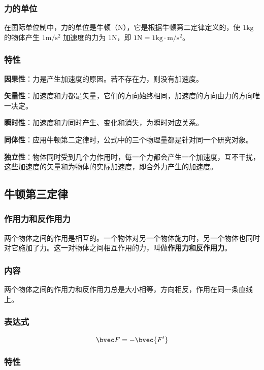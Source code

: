 \subsubsection{力的单位}
在国际单位制中，力的单位是牛顿（$\mathrm N$），它是根据牛顿第二定律定义的，使 $1\mathrm{kg}$ 的物体产生 $1\mathrm{m/s^2}$ 加速度的力为 $1\mathrm N$，即 $1\mathrm N=1\mathrm{kg \cdot m/s^2}$。

\subsubsection{特性}
\textbf{因果性}：力是产生加速度的原因。若不存在力，则没有加速度。

\textbf{矢量性}：加速度和力都是矢量，它们的方向始终相同，加速度的方向由力的方向唯一决定。

\textbf{瞬时性}：加速度和力同时产生、变化和消失，为瞬时对应关系。

\textbf{同体性}：应用牛顿第二定律时，公式中的三个物理量都是针对同一个研究对象。

\textbf{独立性}：物体同时受到几个力作用时，每一个力都会产生一个加速度，互不干扰，这些加速度的矢量和为物体的实际加速度，即合外力产生的加速度。

\subsection{牛顿第三定律}
\subsubsection{作用力和反作用力}
两个物体之间的作用是相互的。一个物体对另一个物体施力时，另一个物体也同时对它施加了力。这一对物体之间相互作用的力，叫做\textbf{作用力和反作用力}。

\subsubsection{内容}
两个物体之间的作用力和反作用力总是大小相等，方向相反，作用在同一条直线上。

\subsubsection{表达式}
\begin{equation}
\bvec F=-\bvec {F'}
\end{equation}

\subsubsection{特性}

